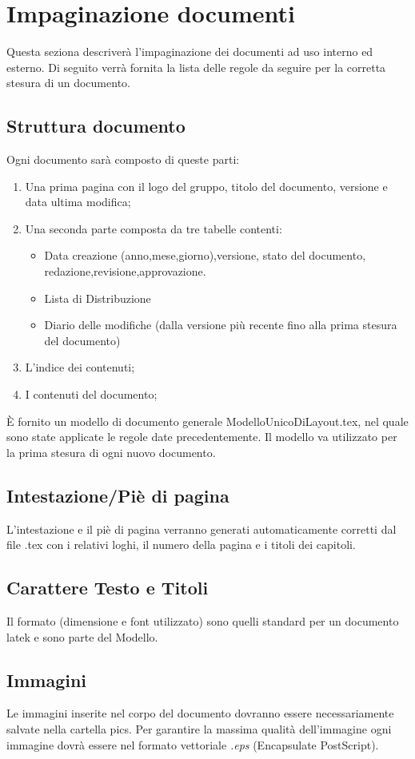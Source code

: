 \section{Impaginazione documenti}
Questa seziona descriver\`a l'impaginazione dei documenti ad uso interno ed esterno. Di seguito verr\`a fornita la lista delle regole da seguire per la corretta stesura di un documento.
\subsection{Struttura documento}
Ogni documento sar\`a composto di queste parti:
\begin{enumerate}
\item Una prima pagina con il logo del gruppo, titolo del documento, versione e data ultima modifica;
\item Una seconda parte composta da tre tabelle contenti:
	{\begin{itemize}
	\item Data creazione (anno,mese,giorno),versione, stato del documento, redazione,revisione,approvazione.
	\item Lista di Distribuzione
	\item Diario delle modifiche (dalla versione pi\`u recente fino alla prima stesura del documento)
	\end{itemize}}
\item L'indice dei contenuti;
\item I contenuti del documento;
\end{enumerate}
\`E fornito un modello di documento generale ModelloUnicoDiLayout.tex, nel quale sono state applicate le regole date precedentemente. Il modello va utilizzato per la prima stesura di ogni nuovo documento.
\subsection{Intestazione/Pi\`e di pagina}
L'intestazione e il pi\`e di pagina verranno generati automaticamente corretti dal file .tex con i relativi loghi, il numero della pagina e i titoli dei capitoli.
\subsection{Carattere Testo e Titoli}
Il formato (dimensione e font utilizzato) sono quelli standard per un documento latek e sono parte del Modello.
\subsection{Immagini}
Le immagini inserite nel corpo del documento dovranno essere necessariamente salvate nella cartella pics. Per garantire la massima qualit\`a dell'immagine ogni immagine dovr\`a essere nel formato vettoriale \textit{.eps} (Encapsulate PostScript).

